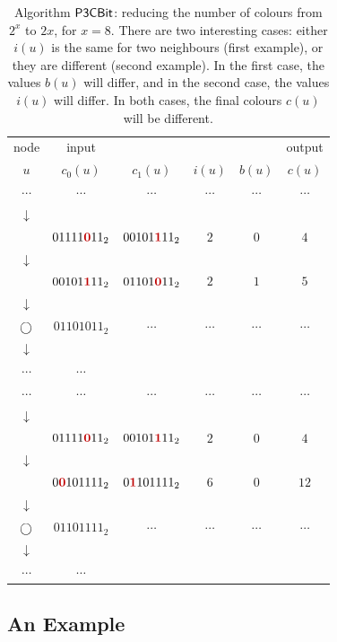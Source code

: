 \begin{table}
    \newcommand{\hl}[1]{\mathbf{\color{hlcolor}#1}}
    \newcommand{\node}{\raisebox{-1pt}{$\bigcirc$}}
    \newcommand{\mylf}{\\[-2pt]}
    \center
    \begin{tabular}{@{}c@{\qquad}ccccc@{}}
    \toprule
    node & input &&&& output \\
    $u$ & $c_0(u)$ & $c_1(u)$ & $i(u)$ & $b(u)$ & $c(u)$ \\
    \midrule
    $\cdots$ & $\cdots$ & $\cdots$ & $\cdots$ & $\cdots$ & $\cdots$ \mylf
    $\downarrow$ \mylf
    \node & $01111\hl{0}11_2$ & $00101\hl{1}11_2$ & $2$ & $0$ & $4$ \mylf
    $\downarrow$ \mylf
    \node & $00101\hl{1}11_2$ & $01101\hl{0}11_2$ & $2$ & $1$ & $5$ \mylf
    $\downarrow$ \mylf
    $\node$ & $01101011_2$ & $\cdots$ & $\cdots$ & $\cdots$ & $\cdots$ \mylf
    $\downarrow$ \mylf
    $\cdots$ & $\cdots$ \mylf
    \midrule
    $\cdots$ & $\cdots$ & $\cdots$ & $\cdots$ & $\cdots$ & $\cdots$ \mylf
    $\downarrow$ \mylf
    \node & $01111\hl{0}11_2$ & $00101\hl{1}11_2$ & $2$ & $0$ & $4$ \mylf
    $\downarrow$ \mylf
    \node & $0\hl{0}101111_2$ & $0\hl{1}101111_2$ & $6$ & $0$ & $12$ \mylf
    $\downarrow$ \mylf
    $\node$ & $01101111_2$ & $\cdots$ & $\cdots$ & $\cdots$ & $\cdots$ \mylf
    $\downarrow$ \mylf
    $\cdots$ & $\cdots$ \mylf
    \bottomrule
    \end{tabular}
    \caption{Algorithm $\textsf{P3CBit}$: reducing the number of colours from $2^x$ to $2x$, for $x = 8$. There are two interesting cases: either $i(u)$ is the same for two neighbours (first example), or they are different (second example). In the first case, the values $b(u)$ will differ, and in the second case, the values $i(u)$ will differ. In both cases, the final colours $c(u)$ will be different.}\label{tab:algo-p3cbit}
\end{table}


\subsection{An Example}

